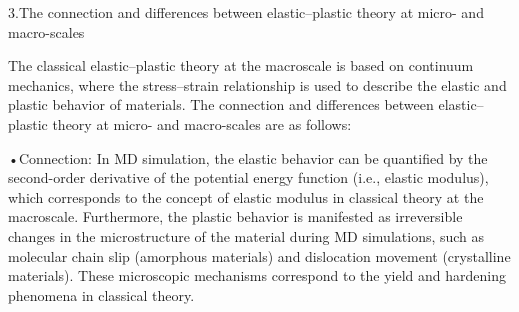 \documentclass{article}
\begin{document}
\begin{hangpars}
3.\quad The connection and differences between elastic–plastic theory at micro- and macro-scales

The classical elastic–plastic theory at the macroscale is based on continuum mechanics, where the stress–strain relationship is used to describe the elastic and plastic behavior of materials. The connection and differences between elastic–plastic theory at micro- and macro-scales are as follows:

•\quad Connection: In MD simulation, the elastic behavior can be quantified by the second-order derivative of the potential energy function (i.e., elastic modulus), which corresponds to the concept of elastic modulus in classical theory at the macroscale. Furthermore, the plastic behavior is manifested as irreversible changes in the microstructure of the material during MD simulations, such as molecular chain slip (amorphous materials) and dislocation movement (crystalline materials). These microscopic mechanisms correspond to the yield and hardening phenomena in classical theory.
\end{hangpars}
\end{document}
